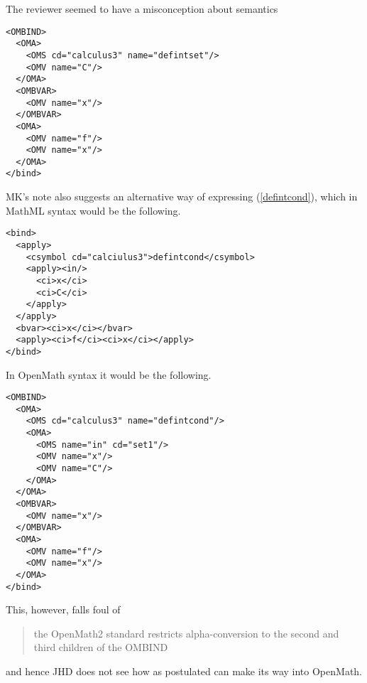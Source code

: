 \documentclass{llncs}
\begin{document}
\begin{newpart}{The reviewer seemed to have a misconception about semantics}
\begin{lstlisting}
<OMBIND>
  <OMA>
    <OMS cd="calculus3" name="defintset"/>
    <OMV name="C"/>
  </OMA>
  <OMBVAR>
    <OMV name="x"/>
  </OMBVAR>
  <OMA>
    <OMV name="f"/>
    <OMV name="x"/>
  </OMA>
</bind>
\end{lstlisting}
MK's note also suggests an alternative way of expressing (\ref{defintcond}),
which in MathML syntax would be the following.
\begin{lstlisting}[language=MathML2]
<bind>
  <apply>
    <csymbol cd="calciulus3">defintcond</csymbol>
    <apply><in/>
      <ci>x</ci>
      <ci>C</ci>
    </apply>
  </apply>
  <bvar><ci>x</ci></bvar>
  <apply><ci>f</ci><ci>x</ci></apply>
</bind> 
\end{lstlisting}
In OpenMath syntax it would be the following.
\begin{lstlisting}
<OMBIND>
  <OMA>
    <OMS cd="calculus3" name="defintcond"/>
    <OMA>
      <OMS name="in" cd="set1"/>
      <OMV name="x"/>
      <OMV name="C"/>
    </OMA>
  </OMA>
  <OMBVAR>
    <OMV name="x"/>
  </OMBVAR>
  <OMA>
    <OMV name="f"/>
    <OMV name="x"/>
  </OMA>
</bind>
\end{lstlisting}
This, however, falls foul of %
\begin{quotation}\noindent\label{OMbound}
the OpenMath2 standard restricts alpha-conversion to the second and third
children of the OMBIND
\end{quotation}
and hence JHD does not see how {} as postulated can make its
way into OpenMath.

\end{newpart}
\end{document}

